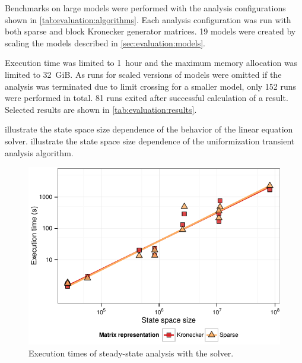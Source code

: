 Benchmarks on large models were performed with the analysis
configurations shown in \cref{tab:evaluation:algorithms}. Each
analysis configuration was run with both sparse and block Kronecker
generator matrices. 19 models were created by scaling the models
described in \cref{sec:evaluation:models}.

Execution time was limited to 1~hour and the maximum memory allocation
was limited to 32~GiB. As runs for scaled versions of models were
omitted if the analysis was terminated due to limit crossing for a
smaller model, only 152 runs were performed in total. 81 runs exited
after successful calculation of a result. Selected results are shown
in \cref{tab:evaluation:results}.

illustrate the state space size dependence of the behavior of the
 linear equation solver.
illustrate the state space size dependence of the uniformization
transient analysis algorithm.

\begin{figure}
  \centering
  \includegraphics{figures/Bicgstab_matrix_time}
  \caption{Execution times of steady-state analysis with the
     solver.}
  \label{fig:evaluation:bicgstab-time}
\end{figure}

